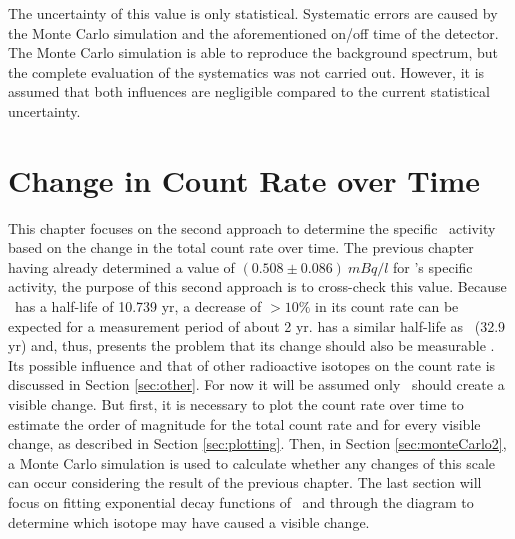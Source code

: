 \documentclass[encoding=utf8,british]{tumphthesis}
\begin{document}
The uncertainty of this value is only statistical.
Systematic errors are caused by the Monte Carlo simulation and the aforementioned on/off time of the detector. 
The Monte Carlo simulation is able to reproduce the background spectrum, but the complete evaluation of the systematics was not carried out.
However, it is assumed that both influences are negligible compared to the current statistical uncertainty.






























\chapter{Change in Count Rate over Time}
\label{sec:SAfromDecrease}

This chapter focuses on the second approach to determine the specific \Kr\ activity based on the change in the total count rate over time.
The previous chapter having already determined a value of $(0.508\pm0.086) \ \unit{mBq}/\unit{l}$ for \Kr's specific activity, the purpose of this second approach is to cross-check this value.
Because \Kr\ has a half-life of 10.739 yr, a decrease of $ >10\% $ in its count rate can be expected for a measurement period of about 2 yr.
 has a similar half-life as \Kr\ (32.9 yr) and, thus, presents the problem that its change should also be measurable \cite{chen_nuclear_2016}.
Its possible influence and that of other radioactive isotopes on the count rate is discussed in Section \ref{sec:other}. 
For now it will be assumed only \Kr\ should create a visible change.
But first, it is necessary to plot the count rate over time to estimate the order of magnitude for the total count rate and for every visible change, as described in Section \ref{sec:plotting}.
Then, in Section \ref{sec:monteCarlo2}, a Monte Carlo simulation is used to calculate whether any changes of this scale can occur considering the result of the previous chapter.
The last section will focus on fitting exponential decay functions of \Kr\ and  through the diagram to determine which isotope may have caused a visible change.   
\\
\end{document}
